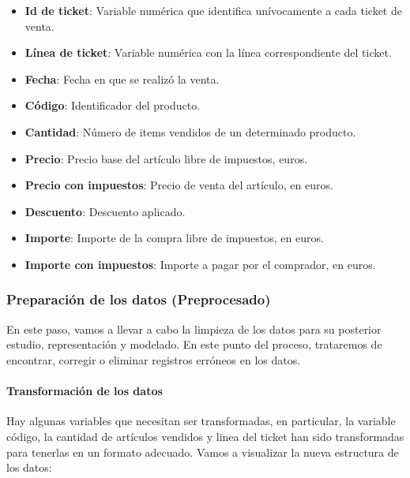 \documentclass[
]{article}
\providecommand{\tightlist}{%
  \setlength{\itemsep}{0pt}\setlength{\parskip}{0pt}}
\begin{document}
\begin{itemize}
\tightlist
\item
  \textbf{Id de ticket}: Variable numérica que identifica unívocamente a
  cada ticket de venta.
\item
  \textbf{Línea de ticket}: Variable numérica con la línea
  correspondiente del ticket.
\item
  \textbf{Fecha}: Fecha en que se realizó la venta.
\item
  \textbf{Código}: Identificador del producto.
\item
  \textbf{Cantidad}: Número de items vendidos de un determinado
  producto.
\item
  \textbf{Precio}: Precio base del artículo libre de impuestos, euros.
\item
  \textbf{Precio con impuestos}: Precio de venta del artículo, en euros.
\item
  \textbf{Descuento}: Descuento aplicado.
\item
  \textbf{Importe}: Importe de la compra libre de impuestos, en euros.
\item
  \textbf{Importe con impuestos}: Importe a pagar por el comprador, en
  euros.
\end{itemize}

\hypertarget{preparaciuxf3n-de-los-datos-preprocesado}{%
\subsubsection{Preparación de los datos
(Preprocesado)}\label{preparaciuxf3n-de-los-datos-preprocesado}}

En este paso, vamos a llevar a cabo la limpieza de los datos para su
posterior estudio, representación y modelado. En este punto del proceso,
trataremos de encontrar, corregir o eliminar registros erróneos en los
datos.

\hypertarget{transformaciuxf3n-de-los-datos}{%
\paragraph{Transformación de los
datos}\label{transformaciuxf3n-de-los-datos}}

Hay algunas variables que necesitan ser transformadas, en particular, la
variable código, la cantidad de artículos vendidos y linea del ticket
han sido transformadas para tenerlas en un formato adecuado. Vamos a
visualizar la nueva estructura de los datos:

\footnotesize
\end{document}
